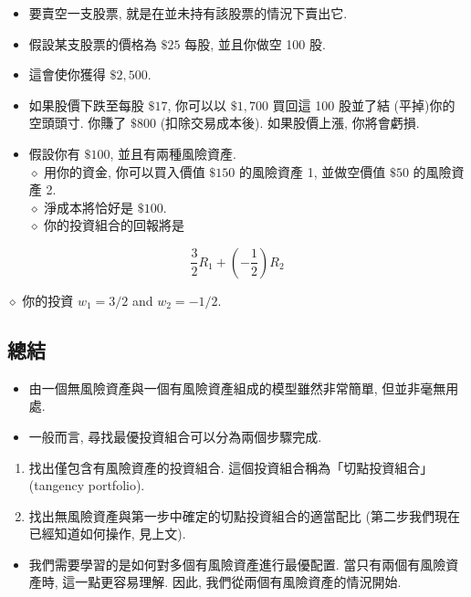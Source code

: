 \documentclass[letterpaper]{article}
\begin{document}
		\begin{itemize}
			\item 要賣空一支股票, 就是在並未持有該股票的情況下賣出它. 
			\item 假設某支股票的價格為 $\$ 25 $ 每股, 並且你做空 100 股. 
			\item 這會使你獲得 $\$ 2, 500$. 
			\item 如果股價下跌至每股 $\$ 17$, 你可以以 $\$ 1, 700$ 買回這 100 股並了結 (平掉)你的空頭頭寸. 你賺了 $\$ 800$ (扣除交易成本後). 如果股價上漲, 你將會虧損. 
			\item 假設你有 $\$ 100$, 並且有兩種風險資產. \\
			$\diamond$ 用你的資金, 你可以買入價值 $\$ 150$ 的風險資產 1, 並做空價值 $\$ 50$ 的風險資產 2. \\
			$\diamond$ 淨成本將恰好是 $\$ 100$. \\
			$\diamond$ 你的投資組合的回報將是
		\end{itemize}
		
		$$
		\frac{3}{2} R_{1}+\left (-\frac{1}{2}\right) R_{2}
		$$
		
		$\diamond$ 你的投資 $w_{1}=3 / 2$ and $w_{2}=-1 / 2$.
		
		\subsection{總結}
		\begin{itemize}
			\item 由一個無風險資產與一個有風險資產組成的模型雖然非常簡單, 但並非毫無用處.   
			\item 一般而言, 尋找最優投資組合可以分為兩個步驟完成.   
		\end{itemize}
		
		\begin{enumerate}
			\item 找出僅包含有風險資產的投資組合. 這個投資組合稱為「切點投資組合」 (tangency portfolio).   
			\item 找出無風險資產與第一步中確定的切點投資組合的適當配比 (第二步我們現在已經知道如何操作, 見上文).   
		\end{enumerate}
		
		
		\begin{itemize}
			\item 我們需要學習的是如何對多個有風險資產進行最優配置. 當只有兩個有風險資產時, 這一點更容易理解. 因此, 我們從兩個有風險資產的情況開始.   
			
		\end{itemize}
		
\end{document}
